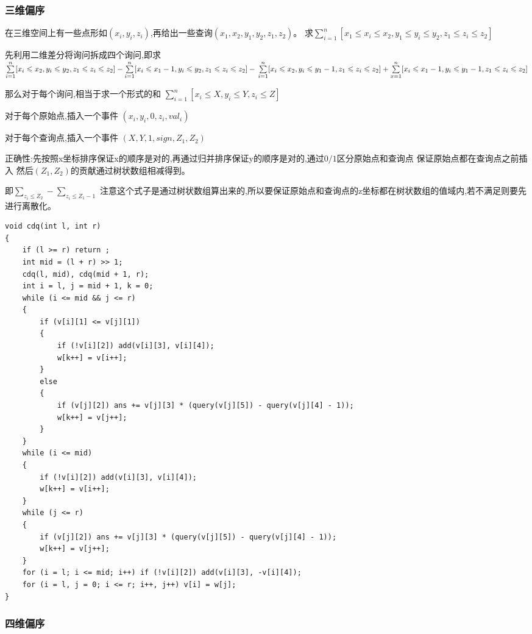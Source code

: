\documentclass[a4paper, fontset=none]{ctexart}
\begin{document}
\subsubsection{三维偏序}
在三维空间上有一些点形如$(x_i, y_i, z_i)$,再给出一些查询$(x_1, x_2, y_1, y_2, z_1, z_2)$。
求$\sum\limits_{i=1}^n[x_1\leqslant x_i\leqslant x_2, y_1\leqslant y_i\leqslant y_2, z_1\leqslant z_i\leqslant z_2]$

先利用二维差分将询问拆成四个询问,即求$\sum\limits_{i=1}^n[x_i\leqslant x_2, y_i\leqslant y_2, z_1\leqslant z_i\leqslant z_2]-
\sum\limits_{i=1}^n[x_i\leqslant x_1-1, y_i\leqslant y_2, z_1\leqslant z_i\leqslant z_2]-
\\\sum\limits_{i=1}^n[x_i\leqslant x_2, y_i\leqslant y_1-1, z_1\leqslant z_i\leqslant z_2]+
\sum\limits_{x=1}^n[x_i\leqslant x_1-1, y_i\leqslant y_1-1, z_1\leqslant z_i\leqslant z_2]$

那么对于每个询问,相当于求一个形式的和 $\sum\limits_{i=1}^n[x_i\leqslant X, y_i\leqslant Y, z_i\leqslant Z]$

对于每个原始点,插入一个事件 $(x_i, y_i, 0, z_i, val_i)$

对于每个查询点,插入一个事件 $(X, Y, 1, sign, Z_1, Z_2)$

正确性:先按照x坐标排序保证x的顺序是对的,再通过归并排序保证y的顺序是对的,通过$0/1$区分原始点和查询点
保证原始点都在查询点之前插入 然后$(Z_1, Z_2)$的贡献通过树状数组相减得到。

即$\sum\limits_{z_i\leqslant Z_2}-\sum\limits_{z_i\leqslant Z_1-1}$
注意这个式子是通过树状数组算出来的,所以要保证原始点和查询点的z坐标都在树状数组的值域内,若不满足则要先进行离散化。
\begin{verbatim}
void cdq(int l, int r)
{
    if (l >= r) return ;
    int mid = (l + r) >> 1;
    cdq(l, mid), cdq(mid + 1, r);
    int i = l, j = mid + 1, k = 0;
    while (i <= mid && j <= r)
    {
        if (v[i][1] <= v[j][1])
        {
            if (!v[i][2]) add(v[i][3], v[i][4]);
            w[k++] = v[i++];
        }
        else
        {
            if (v[j][2]) ans += v[j][3] * (query(v[j][5]) - query(v[j][4] - 1));
            w[k++] = v[j++];
        }
    }
    while (i <= mid)
    {
        if (!v[i][2]) add(v[i][3], v[i][4]);
        w[k++] = v[i++];
    }
    while (j <= r)
    {
        if (v[j][2]) ans += v[j][3] * (query(v[j][5]) - query(v[j][4] - 1));
        w[k++] = v[j++];
    }
    for (i = l; i <= mid; i++) if (!v[i][2]) add(v[i][3], -v[i][4]);
    for (i = l, j = 0; i <= r; i++, j++) v[i] = w[j];
}
\end{verbatim}
\subsubsection{四维偏序}
\end{document}
